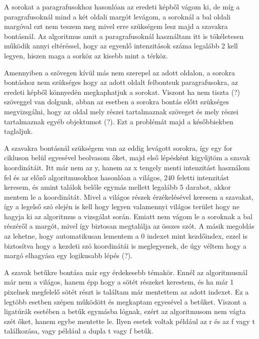 A sorokat a paragrafusokhoz hasonlóan az eredeti képből vágom ki, de míg a paragrafusoknál mind a két oldali margót levágom, a soroknál a bal oldali margóval ezt nem teszem meg mivel erre szükségem lesz majd a szavakra bontásnál. Az algoritmus amit a paragrafusoknál használtam itt is tökéletesen működik annyi eltéréssel, hogy az egyenlő intenzitások száma legalább 2 kell legyen, hiszen maga a sorköz az kisebb mint a térköz.

Amennyiben a szövegen kívül más nem szerepel az adott oldalon, a sorokra bontáshoz nem szükséges hogy az adott oldalt felbontsuk paragrafusokra, az eredeti képből könnyedén megkaphatjuk a sorokat. Viszont ha nem tiszta (?) szöveggel van dolgunk, abban az esetben a sorokra bontás előtt szükséges megvizsgálni, hogy az oldal mely részei tartalmaznak szöveget és mely részei tartalmaznak egyéb objektumot (?). Ezt a problémát majd a későbbiekben taglaljuk.

A szavakra bontásnál szükségem van az eddig levágott sorokra, így egy for cikluson belül egyesével beolvasom őket, majd első lépésként kigyűjtöm a szavak koordinátáit. Itt már nem az y, hanem az x tengely menti intenzitást használom fel és az előző algoritmusokhoz hasonlóan a világos, 240 feletti intenzitást keresem, és amint találok belőle egymás mellett legalább 5 darabot, akkor mentem le a koordinátát. Mivel a világos részek érzékelésével keresem a szavakat, így a legelső szó elején is kell hogy legyen valamennyi világos terület hogy ne hagyja ki az algoritmus a vizsgálat során. Emiatt nem vágom le a soroknak a bal részéről a margót, mivel így biztosan megtalálja az összes szót. A másik megoldás az lehetne, hogy automatikusan lementem a 0 indexet mint kezdőindex, ezzel is biztosítva hogy a kezdeti szó koordinátái is meglegyenek, de úgy véltem hogy a margó elhagyása egy logikusabb lépés (?).

A szavak betűkre bontása már egy érdekesebb témakör. Ennél az algoritmusnál már nem a világos, hanem épp hogy a sötét részeket kerestem, és ha már 1 pixelnek megfelelő sötét részt is találtam már mentettem az adott indexet. Ez a legtöbb esetben szépen működött és megkaptam egyesével a betűket. Viszont a ligatúrák esetében a betűk egymásba lógnak, ezért az algoritmusom nem vágta szét őket, hanem egybe mentette le. Ilyen esetek voltak például az r és az f vagy t találkozása, vagy például a dupla t vagy f betűk.

